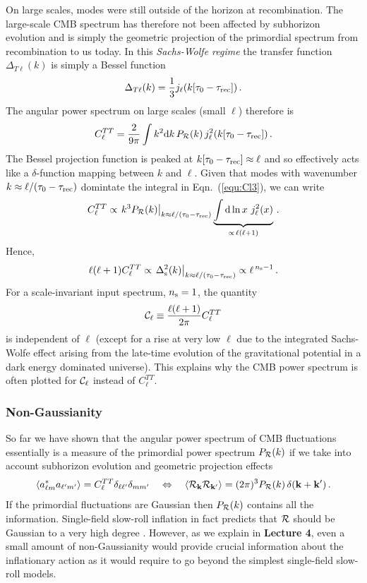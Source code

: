 \documentclass[12pt,letterpaper,rotate]{article}
\def\beq{\begin{equation}}
\def\eeq{\end{equation}}
\def\d{{\rm d}}
\def\R{{\cal R}}
\begin{document}
{On large scales, modes were still outside of the horizon at recombination.
The large-scale CMB spectrum has therefore not been affected by subhorizon evolution and is simply the geometric projection of the primordial spectrum from recombination to us today.
In this {\it Sachs-Wolfe regime} the transfer function $\Delta_{T\ell}(k)$ is simply a Bessel function \cite{Dodelson}
\beq
\Delta_{T \ell}(k) = \frac{1}{3} j_\ell(k[\tau_0-\tau_{\rm rec}])\, .
\eeq
The angular power spectrum on large scales (small $\ell$) therefore is
\beq
\label{equ:Cl3}
C_\ell^{TT} = \frac{2}{9 \pi} \int k^2 \d k \, P_\R(k) \, j_\ell^2(k[\tau_0-\tau_{\rm rec}]) \, .
\eeq
The Bessel projection function is peaked at $k[\tau_0-\tau_{\rm rec}] \approx \ell$ and so effectively acts like a $\delta$-function mapping between $k$ and $\ell$.
Given that modes with wavenumber $k\approx \ell/(\tau_0-\tau_{\rm rec})$ domintate the integral in Eqn.~(\ref{equ:Cl3}), we can write
\beq
C_\ell^{TT} \propto \left. k^3 P_\R(k) \right|_{k\approx \ell/(\tau_0-\tau_{\rm rec})} \underbrace{\int \d \ln x \ j^2_\ell(x)}_{\propto\, \ell(\ell+1)}\, .
\eeq
Hence,
\beq
\ell(\ell+1) C_\ell^{TT} \propto \left. \Delta_{\rm s}^2(k) \right|_{k\approx \ell/(\tau_0-\tau_{\rm rec})} \propto \ell^{\, n_{\rm s}-1}\, .
\eeq
For a scale-invariant input spectrum, $n_{\rm s} =1$, the quantity
\beq
{\cal C}_\ell \equiv \frac{\ell(\ell+1)}{2\pi} C_\ell^{TT}
\eeq
is independent of $\ell$ (except for a rise at very low $\ell$ due to the integrated Sachs-Wolfe effect arising from the late-time evolution of the gravitational potential in a dark energy dominated universe).
This explains why the CMB power spectrum is often plotted for ${\cal C}_\ell$ instead of $C_\ell^{TT}$.


\subsubsection{Non-Gaussianity}

So far we have shown that the angular power spectrum of CMB fluctuations essentially is a measure of the primordial power spectrum $P_\R(k)$ if we take into account subhorizon evolution and geometric projection effects
\beq
\langle a^*_{\ell m} a_{\ell' m'} \rangle = C_\ell^{TT} \delta_{\ell \ell'} \delta_{m m'} \quad \Leftrightarrow \quad 
\langle \R_{{\bf k}} \R_{{\bf k}'} \rangle = (2\pi)^3 P_\R(k)\, \delta({\bf k} + {\bf k}')\, .
\eeq
If the primordial fluctuations are Gaussian then $P_\R(k)$ contains all the information.
Single-field slow-roll inflation in fact predicts that $\R$ should be Gaussian to a very high degree \cite{malda}.
However, as we explain in {\bf Lecture 4}, even a small amount of non-Gaussianity would provide crucial information about the inflationary action as it would require to go beyond the simplest single-field slow-roll models.

}
\end{document}
